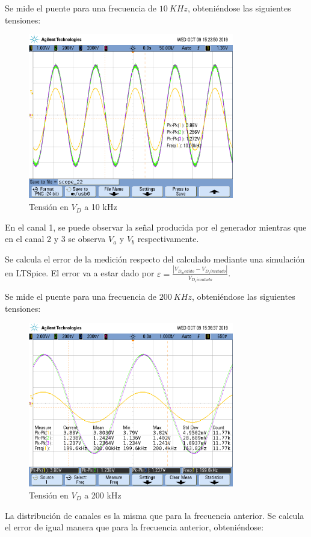 Se mide el puente para una frecuencia de $10 \ KHz $, obteniéndose las siguientes tensiones:

\begin{figure}[H]
\centering
\includegraphics[width=0.8\textwidth,trim={0 2.2cm 0.1cm 1.75cm},clip]{Mediciones/Tensiones_10_KHz}
\caption{Tensión en $V_D$ a 10 kHz}
\label{fig:Tensiones_10_KHz}
\end{figure}
En el canal 1, se puede observar la señal producida por el generador mientras que en el canal 2 y 3 se observa $V_a$ y $V_b$ respectivamente.\par

Se calcula el error de la medición respecto del calculado mediante una simulación en LTSpice. El error va a estar dado por $\varepsilon = \frac{|V_{D_medido}-V_{D_simulado}|}{V_{D_simulado}}$.

Se mide el puente para una frecuencia de $200 \ KHz $, obteniéndose las siguientes tensiones:
\begin{figure}[H]
\centering
\includegraphics[width=0.8\textwidth,trim={0 2.2cm 0.1cm 1.75cm},clip]{Mediciones/Tensiones_200_KHz}
\caption{Tensión en $V_D$ a 200 kHz}
\label{fig:Tensiones_200_KHz}
\end{figure}
La distribución de canales es la misma que para la frecuencia anterior. Se calcula el error de igual manera que para la frecuencia anterior, obteniéndose:


